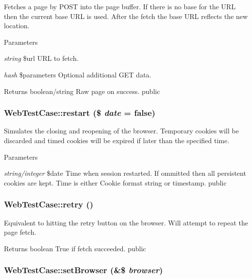 \label{class_web_test_case_a7d409a4e22876ab2b96ee330c0bedc8c}
Fetches a page by POST into the page buffer. If there is no base for the URL then the current base URL is used. After the fetch the base URL reflects the new location. 
\begin{DoxyParams}{Parameters}
\item[{\em string}]\$url URL to fetch. \item[{\em hash}]\$parameters Optional additional GET data. \end{DoxyParams}
\begin{DoxyReturn}{Returns}
boolean/string Raw page on success.  public 
\end{DoxyReturn}
\hypertarget{class_web_test_case_a7c3811b06a5a25b08baabe63599ac6e6}{
\subsubsection[{restart}]{\setlength{\rightskip}{0pt plus 5cm}WebTestCase::restart (\$ {\em date} = {\ttfamily false})}}
\label{class_web_test_case_a7c3811b06a5a25b08baabe63599ac6e6}
Simulates the closing and reopening of the browser. Temporary cookies will be discarded and timed cookies will be expired if later than the specified time. 
\begin{DoxyParams}{Parameters}
\item[{\em string/integer}]\$date Time when session restarted. If ommitted then all persistent cookies are kept. Time is either Cookie format string or timestamp.  public \end{DoxyParams}
\hypertarget{class_web_test_case_ae8327032083ec6211ad823c45cb72084}{
\subsubsection[{retry}]{\setlength{\rightskip}{0pt plus 5cm}WebTestCase::retry ()}}
\label{class_web_test_case_ae8327032083ec6211ad823c45cb72084}
Equivalent to hitting the retry button on the browser. Will attempt to repeat the page fetch. \begin{DoxyReturn}{Returns}
boolean True if fetch succeeded.  public 
\end{DoxyReturn}
\hypertarget{class_web_test_case_a6a7359c09fc9665e5d34c2c69068134f}{
\subsubsection[{setBrowser}]{\setlength{\rightskip}{0pt plus 5cm}WebTestCase::setBrowser (\&\$ {\em browser})}}

